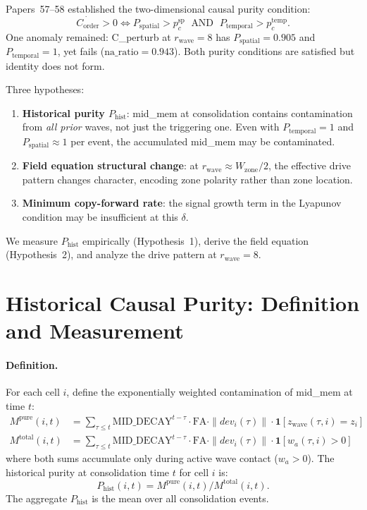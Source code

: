 \documentclass[11pt,a4paper]{article}
\newcommand{\Corder}{C_{\mathrm{order}}}
\newcommand{\na}{\mathrm{na\_ratio}}
\newcommand{\Psp}{P_{\mathrm{spatial}}}
\newcommand{\Ptemp}{P_{\mathrm{temporal}}}
\newcommand{\Phist}{P_{\mathrm{hist}}}
\begin{document}
Papers~57--58 established the two-dimensional causal purity condition:
\begin{equation}
  \dot{\Corder} > 0 \iff \Psp > p_c^\mathrm{sp}
  \;\text{ AND }\; \Ptemp > p_c^\mathrm{temp}.
  \label{eq:2d}
\end{equation}
One anomaly remained: C\_perturb at $r_\mathrm{wave}=8$ has $\Psp=0.905$ and
$\Ptemp=1$, yet fails ($\na=0.943$).
Both purity conditions are satisfied but identity does not form.

Three hypotheses:
\begin{enumerate}
  \item \textbf{Historical purity $\Phist$}: mid\_mem at consolidation contains
    contamination from \emph{all prior} waves, not just the triggering one.
    Even with $\Ptemp=1$ and $\Psp\approx 1$ per event, the accumulated
    mid\_mem may be contaminated.
  \item \textbf{Field equation structural change}: at $r_\mathrm{wave}\approx W_\mathrm{zone}/2$,
    the effective drive pattern changes character, encoding zone polarity rather
    than zone location.
  \item \textbf{Minimum copy-forward rate}: the signal growth term in the
    Lyapunov condition may be insufficient at this $\delta$.
\end{enumerate}

We measure $\Phist$ empirically (Hypothesis~1), derive the field equation
(Hypothesis~2), and analyze the drive pattern at $r_\mathrm{wave}=8$.

\section{Historical Causal Purity: Definition and Measurement}

\paragraph{Definition.}
For each cell $i$, define the exponentially weighted contamination of mid\_mem
at time $t$:
\begin{align}
  M^\mathrm{pure}(i,t) &= \sum_{\tau \leq t} \text{MID\_DECAY}^{t-\tau}
    \cdot \mathrm{FA} \cdot \|dev_i(\tau)\| \cdot
    \mathbf{1}[z_\mathrm{wave}(\tau,i) = z_i] \\
  M^\mathrm{total}(i,t) &= \sum_{\tau \leq t} \text{MID\_DECAY}^{t-\tau}
    \cdot \mathrm{FA} \cdot \|dev_i(\tau)\| \cdot
    \mathbf{1}[w_a(\tau,i) > 0]
\end{align}
where both sums accumulate only during active wave contact ($w_a > 0$).
The historical purity at consolidation time $t$ for cell $i$ is:
\begin{equation}
  \Phist(i,t) = M^\mathrm{pure}(i,t) / M^\mathrm{total}(i,t).
\end{equation}
The aggregate $\Phist$ is the mean over all consolidation events.
\end{document}
